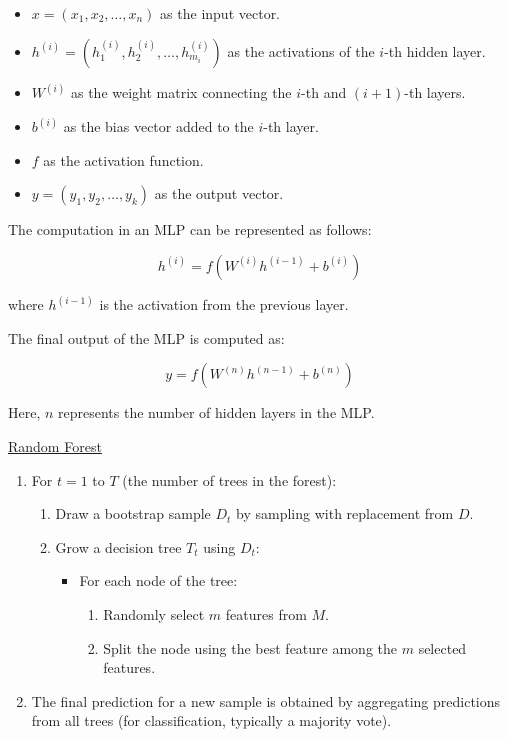 \documentclass{uathesis-es}
\begin{document}
{\begin{itemize}
    \item $x = (x_1, x_2, \ldots, x_n)$ as the input vector.
    \item $h^{(i)} = (h_1^{(i)}, h_2^{(i)}, \ldots, h_{m_i}^{(i)})$ as the activations of the $i$-th hidden layer.
    \item $W^{(i)}$ as the weight matrix connecting the $i$-th and $(i+1)$-th layers.
    \item $b^{(i)}$ as the bias vector added to the $i$-th layer.
    \item $f$ as the activation function.
    \item $y = (y_1, y_2, \ldots, y_k)$ as the output vector.
\end{itemize}

The computation in an MLP can be represented as follows:

\[
h^{(i)} = f(W^{(i)}h^{(i-1)} + b^{(i)})
\]

where $h^{(i-1)}$ is the activation from the previous layer.

The final output of the MLP is computed as:

\[
y = f(W^{(n)}h^{(n-1)} + b^{(n)})
\]

Here, $n$ represents the number of hidden layers in the MLP.

\underline{Random Forest}

\begin{enumerate}
    \item For $t = 1$ to $T$ (the number of trees in the forest):
        \begin{enumerate}
            \item Draw a bootstrap sample $D_t$ by sampling with replacement from $D$.
            \item Grow a decision tree $T_t$ using $D_t$:
                \begin{itemize}
                    \item For each node of the tree:
                        \begin{enumerate}
                            \item Randomly select $m$ features from $M$.
                            \item Split the node using the best feature among the $m$ selected features.
                        \end{enumerate}
                \end{itemize}
        \end{enumerate}
    \item The final prediction for a new sample is obtained by aggregating predictions from all trees (for classification, typically a majority vote).
\end{enumerate}


}
\end{document}
